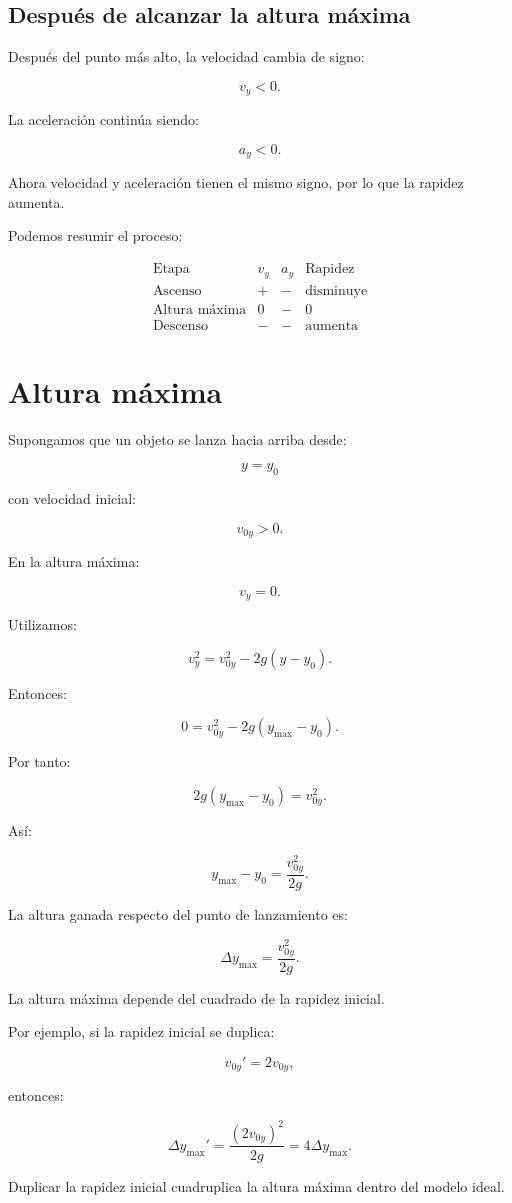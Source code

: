 \subsection{Después de alcanzar la altura máxima}

Después del punto más alto, la velocidad cambia de signo:

\[ v_y<0. \]

La aceleración continúa siendo:

\[ a_y<0. \]

Ahora velocidad y aceleración tienen el mismo signo, por lo que la rapidez aumenta.

Podemos resumir el proceso:

\[
\begin{array}{c|c|c|c}
\text{Etapa} & v_y & a_y & \text{Rapidez} \\ \hline
\text{Ascenso} & + & - & \text{disminuye} \\
\text{Altura máxima} & 0 & - & 0 \\
\text{Descenso} & - & - & \text{aumenta}
\end{array}
\]


\section{Altura máxima}

Supongamos que un objeto se lanza hacia arriba desde:

\[ y=y_0 \]

con velocidad inicial:

\[ v_{0y}>0. \]

En la altura máxima:

\[ v_y=0. \]

Utilizamos:

\[ v_y^2=v_{0y}^2-2g(y-y_0). \]

Entonces:

\[ 0=v_{0y}^2-2g(y_{\max}-y_0). \]

Por tanto:

\[ 2g(y_{\max}-y_0)=v_{0y}^2. \]

Así:

\[ \boxed{y_{\max}-y_0=\frac{v_{0y}^2}{2g}}. \]

La altura ganada respecto del punto de lanzamiento es:

\[ \boxed{\Delta y_{\max}=\frac{v_{0y}^2}{2g}}. \]

\begin{interpretacion}
La altura máxima depende del cuadrado de la rapidez inicial.

Por ejemplo, si la rapidez inicial se duplica:

\[
v_{0y}'=2v_{0y},
\]

entonces:

\[
\Delta y_{\max}'
=
\frac{(2v_{0y})^2}{2g}
=
4\Delta y_{\max}.
\]

Duplicar la rapidez inicial cuadruplica la altura máxima dentro del modelo ideal.
\end{interpretacion}


